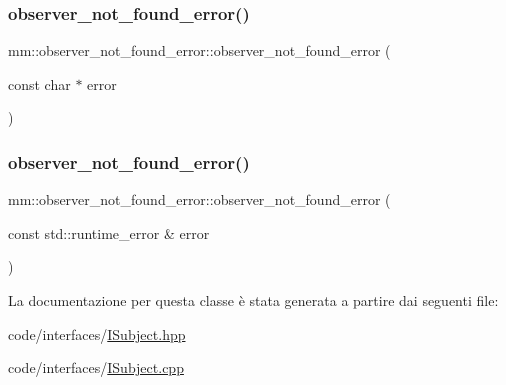 \subsubsection{\texorpdfstring{observer\+\_\+not\+\_\+found\+\_\+error()}{observer\_not\_found\_error()}\hspace{0.1cm}{\footnotesize\ttfamily [2/3]}}
{\footnotesize\ttfamily mm\+::observer\+\_\+not\+\_\+found\+\_\+error\+::observer\+\_\+not\+\_\+found\+\_\+error (\begin{DoxyParamCaption}\item[{const char $\ast$}]{error }\end{DoxyParamCaption})}

\mbox{\label{classmm_1_1observer__not__found__error_a60ab7d1412fcd906c7976e686f9b936b}} 
\subsubsection{\texorpdfstring{observer\+\_\+not\+\_\+found\+\_\+error()}{observer\_not\_found\_error()}\hspace{0.1cm}{\footnotesize\ttfamily [3/3]}}
{\footnotesize\ttfamily mm\+::observer\+\_\+not\+\_\+found\+\_\+error\+::observer\+\_\+not\+\_\+found\+\_\+error (\begin{DoxyParamCaption}\item[{const std\+::runtime\+\_\+error \&}]{error }\end{DoxyParamCaption})}



La documentazione per questa classe è stata generata a partire dai seguenti file\+:\begin{DoxyCompactItemize}
\item 
code/interfaces/\hyperlink{_i_subject_8hpp}{I\+Subject.\+hpp}\item 
code/interfaces/\hyperlink{_i_subject_8cpp}{I\+Subject.\+cpp}\end{DoxyCompactItemize}
